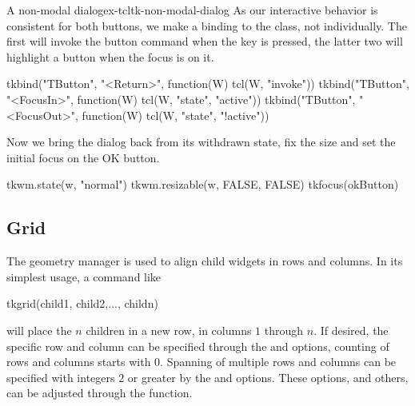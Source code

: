 \begin{example}{A non-modal dialog}{ex-tcltk-non-modal-dialog}
As our interactive behavior is consistent for both buttons, we make a
binding to the  class, not individually. The first will
invoke the button command when the  key is pressed, the
latter two will highlight a button when the focus is on it.
\begin{Schunk}
\begin{Sinput}
 tkbind("TButton", "<Return>", function(W) tcl(W, "invoke"))
 tkbind("TButton", "<FocusIn>", function(W) 
        tcl(W, "state", "active"))
 tkbind("TButton", "<FocusOut>", function(W) 
        tcl(W, "state", "!active"))
\end{Sinput}
\end{Schunk}
%
Now we bring the dialog back from its withdrawn state, fix the size
and set the initial focus on the OK button.
\begin{Schunk}
\begin{Sinput}
 tkwm.state(w, "normal")
 tkwm.resizable(w, FALSE, FALSE)
 tkfocus(okButton)
\end{Sinput}
\end{Schunk}
\end{example}


\subsection{Grid}
\label{sec:tcltk:grid}
The  geometry manager is used to align child widgets
in rows and columns.  In its simplest usage, a command like
\begin{Schunk}
  \begin{Sinput}
tkgrid(child1, child2,..., childn)    
  \end{Sinput}
\end{Schunk}
will place the $n$ children in a new row, in columns $1$ through
$n$. If desired, the specific row and column can be specified through the
 and  options, counting of
rows and columns starts with $0$.  Spanning of multiple rows and columns
can be specified with integers $2$ or greater by the
 and  options. These
options, and others, can be adjusted through the
 function.


